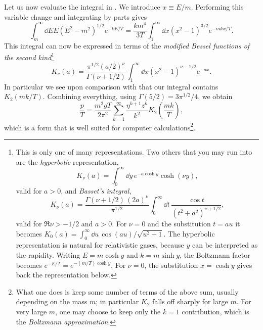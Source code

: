 Let us now evaluate the integral in . We introduce
$x\equiv E/m$. Performing this variable change and integrating by parts gives
\begin{equation}\label{eq:pressint}
  \int_m^\infty\dd{E}E\left(E^2-m^2\right)^{1/2}e^{-kE/T}
  =\frac{km^4}{3T}\int_1^\infty\dd x\left(x^2-1\right)^{3/2}e^{-mkx/T}.
\end{equation}
This integral can now be expressed in terms of the
{\it modified Bessel functions of the second kind}\footnote{This is only one of many
representations. Two others that you may run into are the
{\it hyperbolic} representation,
\begin{equation*}
  K_\nu(a)=\int_0^\infty\dd y\,e^{-a\cosh y}\cosh(\nu y),
\end{equation*}
valid for $a>0$, and {\it Basset's integral},
\begin{equation*}
  K_\nu(a)=\frac{\Gamma(\nu+1/2)\,(2a)^\nu}{\pi^{1/2}}
     \int_0^\infty\dd t\,\frac{\cos t}{\left(t^2+a^2\right)^{\nu+1/2}},
\end{equation*}
valid for $\Re\nu>-1/2$ and $a>0$. For $\nu=0$ and the substitution $t=au$ it becomes
$K_0(a)=\int_0^\infty\dd u\,\cos(au)/\sqrt{u^2+1}$.
The hyperbolic representation is natural for relativistic gases, because
$y$ can be interpreted as the rapidity. Writing $E=m\cosh y$ and $k=m\sinh y$,
the Boltzmann factor becomes $e^{-E/T}=e^{-(m/T)\cosh y}$. For $\nu=0$, the
substitution $x=\cosh y$ gives back the representation below.}
\begin{equation}
  K_\nu(a)=\frac{\pi^{1/2}(a/2)^\nu}{\Gamma(\nu+1/2)}
             \int_1^\infty\dd x(x^2-1)^{\nu-1/2}e^{-ax}.
\end{equation}
In particular we see upon comparison with 
that our integral contains $K_2(mk/T)$. Combining everything,
using $\Gamma(5/2)=3\pi^{1/2}/4$, we obtain
\begin{equation}\label{eq:pressrelQM}
  \frac{p}{T}=\frac{m^2gT}{2\pi^2}\sum_{k=1}^\infty\frac{\eta^{k+1}z^k}{k^2}
                         K_2\left(\frac{mk}{T}\right),
\end{equation}
which is a form that is well suited for computer calculations\footnote{What
one does is keep some number of terms of the above sum, usually depending
on the mass $m$; in particular $K_2$ falls off sharply for large $m$.
For very large $m$, one may choose to keep only the $k=1$ contribution,
which is the {\it Boltzmann approximation}.}.

